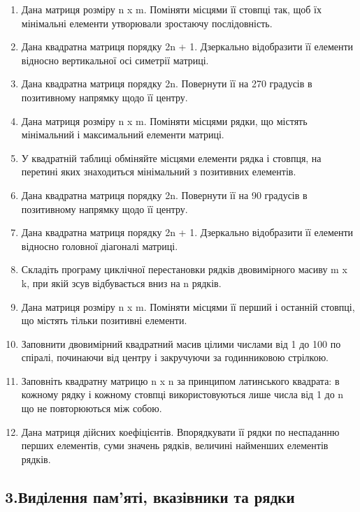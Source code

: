 \documentclass[]{article}
\begin{document}
\begin{enumerate}
\item
  Дана матриця розміру n x m. Поміняти місцями її стовпці так, щоб їх
  мінімальні елементи утворювали зростаючу послідовність.
\item
  Дана квадратна матриця порядку 2n + 1. Дзеркально відобразити її
  елементи відносно вертикальної осі симетрії матриці.
\item
  Дана квадратна матриця порядку 2n. Повернути її на 270 градусів в
  позитивному напрямку щодо її центру.
\item
  Дана матриця розміру n x m. Поміняти місцями рядки, що містять
  мінімальний і максимальний елементи матриці.
\item
  У квадратній таблиці обміняйте місцями елементи рядка і стовпця, на
  перетині яких знаходиться мінімальний з позитивних елементів.
\item
  Дана квадратна матриця порядку 2n. Повернути її на 90 градусів в
  позитивному напрямку щодо її центру.
\item
  Дана квадратна матриця порядку 2n + 1. Дзеркально відобразити її
  елементи відносно головної діагоналі матриці.
\item
  Складіть програму циклічної перестановки рядків двовимірного масиву m
  x k, при якій зсув відбувається вниз на n рядків.
\item
  Дана матриця розміру n x m. Поміняти місцями її перший і останній
  стовпці, що містять тільки позитивні елементи.
\item
  Заповнити двовимірний квадратний масив цілими числами від 1 до 100 по
  спіралі, починаючи від центру і закручуючи за годинниковою стрілкою.
\item
  Заповніть квадратну матрицю n x n за принципом латинського квадрата: в
  кожному рядку і кожному стовпці використовуються лише числа від 1 до n
  що не повторюються між собою.
\item
  Дана матриця дійсних коефіцієнтів. Впорядкувати її рядки по неспаданню
  перших елементів, суми значень рядків, величині найменших елементів
  рядків.
\end{enumerate}

\subsection{3.Виділення пам'яті, вказівники та
рядки}\label{ux432ux438ux434ux456ux43bux435ux43dux43dux44f-ux43fux430ux43cux44fux442ux456-ux432ux43aux430ux437ux456ux432ux43dux438ux43aux438-ux442ux430-ux440ux44fux434ux43aux438}
\end{document}
